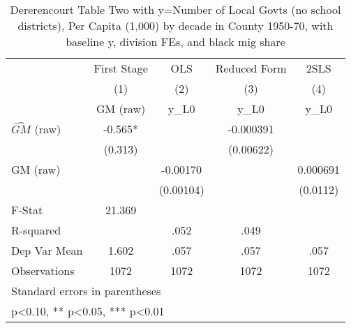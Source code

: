 \begin{table}[htbp]\centering
\def\sym#1{\ifmmode^{#1}\else\(^{#1}\)\fi}
\caption{Dererencourt Table Two with y=Number of Local Govts (no school districts), Per Capita (1,000) by decade in County 1950-70, with baseline y, division FEs, and black mig share}
\begin{tabular}{l*{4}{c}}
\toprule
                    & First Stage   &         OLS   &Reduced Form   &        2SLS   \\
                    &\multicolumn{1}{c}{(1)}&\multicolumn{1}{c}{(2)}&\multicolumn{1}{c}{(3)}&\multicolumn{1}{c}{(4)}\\
                    &\multicolumn{1}{c}{GM  (raw)}&\multicolumn{1}{c}{y\_L0}&\multicolumn{1}{c}{y\_L0}&\multicolumn{1}{c}{y\_L0}\\
\midrule
$\hat{GM}$ (raw)    &      -0.565*  &               &   -0.000391   &               \\
                    &     (0.313)   &               &   (0.00622)   &               \\
\addlinespace
GM  (raw)           &               &    -0.00170   &               &    0.000691   \\
                    &               &   (0.00104)   &               &    (0.0112)   \\
\midrule
F-Stat              &      21.369   &               &               &               \\
R-squared           &               &        .052   &        .049   &               \\
Dep Var Mean        &       1.602   &        .057   &        .057   &        .057   \\
Observations        &        1072   &        1072   &        1072   &        1072   \\
\bottomrule
\multicolumn{5}{l}{\footnotesize Standard errors in parentheses}\\
\multicolumn{5}{l}{\footnotesize * p<0.10, ** p<0.05, *** p<0.01}\\
\end{tabular}
\end{table}
